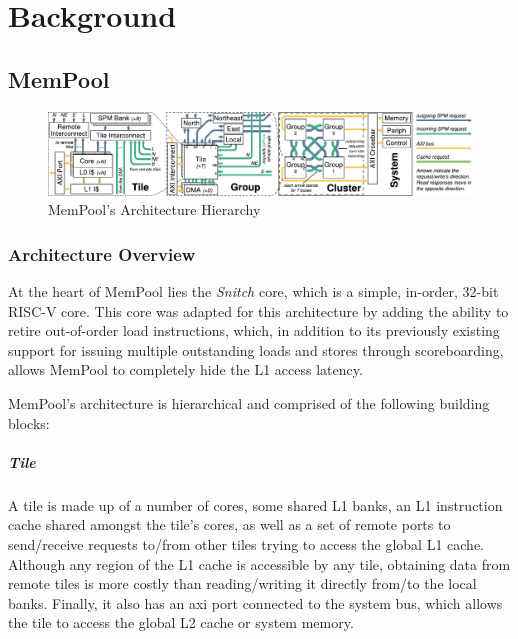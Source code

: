 \chapter{Background}
\label{ch:background}

\section{MemPool}
\label{sec:mempool}

\begin{figure}[t]
	\centering
	\includegraphics[width=\textwidth]{./fig/mempool.pdf}
	\caption{MemPool's Architecture Hierarchy}%
	\label{fig:mempool}
\end{figure}

\subsection{Architecture Overview}
\label{subsec:mempool_architecture}

At the heart of MemPool lies the \emph{Snitch} core, which is a simple, in-order, 32-bit RISC-V
core. This core was adapted for this architecture by adding the ability to retire out-of-order load
instructions, which, in addition to its previously existing support for issuing multiple outstanding
loads and stores through scoreboarding, allows MemPool to completely hide the L1 access latency.

MemPool's architecture is hierarchical and comprised of the following building blocks:

\paragraph{Tile} A tile is made up of a number of cores, some shared L1 banks, an L1 instruction
cache shared amongst the tile's cores, as well as a set of remote ports to send/receive requests
to/from other tiles trying to access the global L1 cache. Although any region of the L1 cache is
accessible by any tile, obtaining data from remote tiles is more costly than reading/writing it
directly from/to the local banks. Finally, it also has an \gls{axi} port connected to the system
bus, which allows the tile to access the global L2 cache or system memory.

